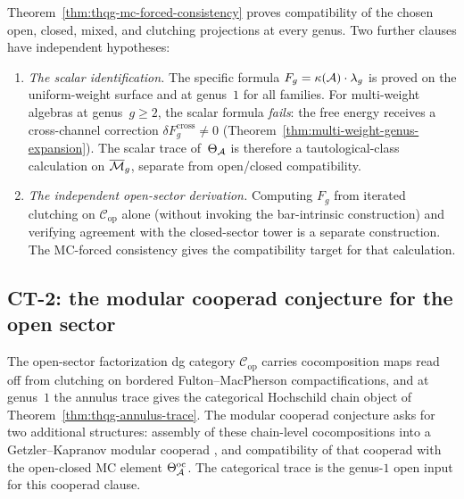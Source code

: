 \begin{remark}
\label{rem:thqg-mc-forced-scope}
Theorem~\ref{thm:thqg-mc-forced-consistency} proves compatibility
of the chosen open, closed, mixed, and clutching projections at
every genus. Two further clauses have independent hypotheses:
\begin{enumerate}[label=\textup{(\roman*)}]
\item \emph{The scalar identification.}
The specific formula $F_g = \kappa(\mathcal{A}) \cdot \lambda_g$
is proved on the uniform-weight surface and at genus~$1$ for all
 families. For multi-weight algebras at genus~$g \geq 2$,
 the scalar formula \emph{fails}: the free energy receives a
 cross-channel correction $\delta F_g^{\mathrm{cross}} \neq 0$
 \textup{(}Theorem~\ref{thm:multi-weight-genus-expansion}\textup{)}.
 The scalar trace of~$\Theta_{\mathcal{A}}$ is therefore a tautological-class
 calculation on $\overline{\mathcal{M}}_g$, separate from open/closed
 compatibility.
\item \emph{The independent open-sector derivation.}
 Computing $F_g$ from iterated clutching on
 $\mathcal{C}_{\mathrm{op}}$ alone (without invoking the
 bar-intrinsic construction) and verifying agreement with the
 closed-sector tower is a separate construction. The MC-forced
 consistency gives the compatibility target for that calculation.
\end{enumerate}
\end{remark}

\subsection{CT-2: the modular cooperad conjecture for the open sector}
\label{subsec:thqg-ct2-cooperad-conjecture}

The open-sector factorization dg category $\mathcal{C}_{\mathrm{op}}$
carries cocomposition maps read off from clutching on bordered
Fulton--MacPherson compactifications, and at genus~$1$ the annulus
trace gives the categorical Hochschild chain object of
Theorem~\ref{thm:thqg-annulus-trace}. The modular cooperad
conjecture asks for two additional structures: assembly of these
chain-level cocompositions into a Getzler--Kapranov modular
cooperad \cite{GetzlerKapranov98}, and compatibility of that
cooperad with the open-closed MC element
$\Theta^{\mathrm{oc}}_{\mathcal{A}}$. The categorical trace is the genus-$1$
open input for this cooperad clause.

